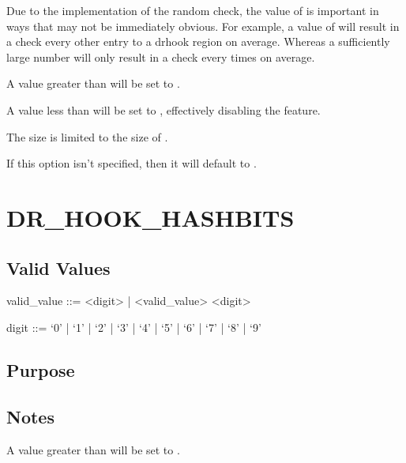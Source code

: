 \documentclass[letterpaper,10pt,english]{sphinxmanual}
\begin{document}
\sphinxAtStartPar
Due to the implementation of the random check, the value of  is important in ways that may not be immediately obvious. For example, a value of  will result in a check every other entry to a drhook region on average. Whereas a sufficiently large number will only result in a check every  times on average.

\sphinxAtStartPar
A value greater than  will be set to .

\sphinxAtStartPar
A value less than  will be set to , effectively disabling the feature.

\sphinxAtStartPar
The size is limited to the size of .

\sphinxAtStartPar
If this option isn’t specified, then it will default to .


\section{DR\_HOOK\_HASHBITS}
\label{\detokenize{flag/flag:dr-hook-hashbits}}\label{\detokenize{flag/flag:id133}}

\subsection{Valid Values}
\label{\detokenize{flag/flag:id134}}
\begin{DUlineblock}{0em}
\item[] valid\_value ::= \textless{}digit\textgreater{} | \textless{}valid\_value\textgreater{} \textless{}digit\textgreater{}
\item[] digit ::= ‘0’ | ‘1’ | ‘2’ | ‘3’ | ‘4’ | ‘5’ | ‘6’ | ‘7’ | ‘8’ | ‘9’
\end{DUlineblock}


\subsection{Purpose}
\label{\detokenize{flag/flag:id135}}

\subsection{Notes}
\label{\detokenize{flag/flag:id137}}
\sphinxAtStartPar
A value greater than  will be set to .
\end{document}
